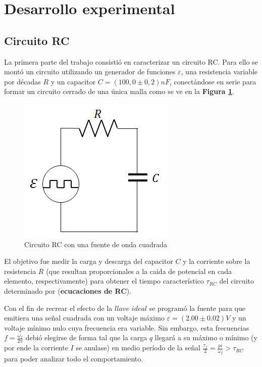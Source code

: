 \documentclass[11pt,a4paper]{article}
\begin{document}

\section{Desarrollo experimental}

\subsection{Circuito RC}

La primera parte del trabajo consistió en caracterizar un circuito RC. Para ello se montó un circuito utilizando un generador de funciones $\varepsilon$, una resistencia variable por décadas $R$ y un capacitor $C = (100,0 \pm 0,2)nF$, conectándose en serie para formar un circuito cerrado de una única malla como se ve en la \textbf{Figura \ref{fig:RC}}. 

\begin{figure}[h]
\centering
  \includegraphics[scale=0.7]{Circuito-RC}
  \caption{Circuito RC con una fuente de onda cuadrada}
  \label{fig:RC}
\end{figure}

El objetivo fue medir la carga y descarga del capacitor $C$ y la corriente sobre la resistencia $R$ (que resultan proporcionales a la caida de potencial en cada elemento, respectivamente) para obtener el tiempo característico $\tau_{RC}$ del circuito determinado por (\textbf{ecucaciones de RC}).
 
Con el fin de recrear el efecto de la $llave$ $ideal$ se programó la fuente para que emitiera una señal cuadrada con un voltaje máximo $\varepsilon = (2.00 \pm 0.02)V$ y un voltaje mínimo nulo cuya frecuencia era variable. Sin embargo, esta frecuencias $f = \frac{\omega_f}{2\pi}$ debió elegirse de forma tal que la carga $q$ llegará a su máximo o mínimo (y por ende la corriente $I$ se anulase) en medio período de la señal $\frac{\tau_f}{2} = \frac{pi}{\omega_f} > \tau_{RC}$ para poder analizar todo el comportamiento.
\end{document}
